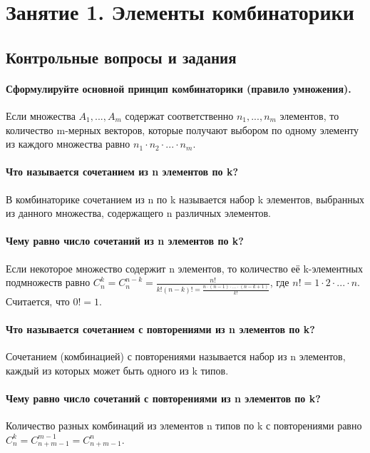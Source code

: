 \documentclass{book}
\begin{document}
\tableofcontents

\chapter*{Занятие 1. Элементы комбинаторики}

\section*{Контрольные вопросы и задания}

\subsubsection*{Сформулируйте основной принцип комбинаторики (правило умножения).}
Если множества $A_1, ..., A_m$ содержат соответственно $n_1, ..., n_m$ элементов, то количество m-мерных векторов, которые получают выбором по одному элементу из каждого множества равно $n_1\cdot n_2\cdot...\cdot n_m$.

\subsubsection*{Что называется сочетанием из n элементов по k?} 
В комбинаторике сочетанием из n по k называется набор k элементов, выбранных из данного множества, содержащего n различных элементов.

\subsubsection*{Чему равно число сочетаний из n элементов по k?}
Если некоторое множество содержит n элементов, то количество её k-элементных подмножеств равно $C_n^k=C_n^{n-k}=\frac{n!}{k!\left(n-k\right)!=\frac{n\cdot\left(n-1\right)\cdot...\cdot\left(n-k+1\right)}{k!}}$, где $n!=1\cdot 2\cdot...\cdot n$. Считается, что $0!=1$.

\subsubsection*{Что называется сочетанием с повторениями из n элементов по k?}
Сочетанием (комбинацией) с повторениями называется набор из n элементов, каждый из которых может быть одного из k типов.

\subsubsection*{Чему равно число сочетаний с повторениями из n элементов по k?}
Количество разных комбинаций из элементов n типов по k с повторениями равно $C_n^k=C_{n+m-1}^{m-1}=C_{n+m-1}^n$.
\end{document}
